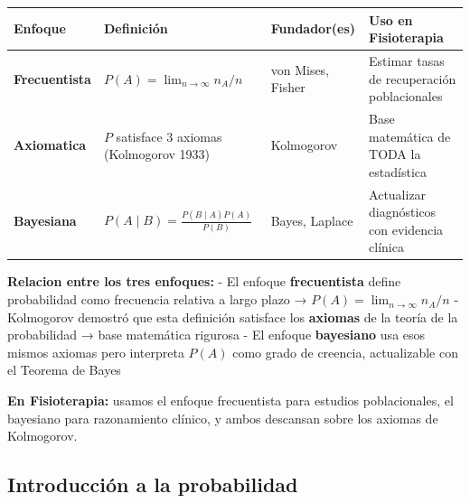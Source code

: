 \documentclass[
  letterpaper,
  DIV=11,
  numbers=noendperiod]{scrartcl}
\newcounter{none} %
\begin{document}
{\def\LTcaptype{none} %
\begin{longtable}[]{@{}
  >{\raggedright\arraybackslash}p{}
  >{\raggedright\arraybackslash}p{}
  >{\raggedright\arraybackslash}p{}
  >{\raggedright\arraybackslash}p{}@{}}
\toprule\noalign{}
\begin{minipage}[b]{\linewidth}\raggedright
Enfoque
\end{minipage} & \begin{minipage}[b]{\linewidth}\raggedright
Definición
\end{minipage} & \begin{minipage}[b]{\linewidth}\raggedright
Fundador(es)
\end{minipage} & \begin{minipage}[b]{\linewidth}\raggedright
Uso en Fisioterapia
\end{minipage} \\
\midrule\noalign{}
\endhead
\bottomrule\noalign{}
\endlastfoot
\textbf{Frecuentista} & \(P(A) = \lim_{n\to\infty} n_A/n\) & von Mises,
Fisher & Estimar tasas de recuperación poblacionales \\
\textbf{Axiomatica} & \(P\) satisface 3 axiomas (Kolmogorov 1933) &
Kolmogorov & Base matemática de TODA la estadística \\
\textbf{Bayesiana} & \(P(A \mid B) = \frac{P(B \mid A)P(A)}{P(B)}\) &
Bayes, Laplace & Actualizar diagnósticos con evidencia clínica \\
\end{longtable}
}

\textbf{Relacion entre los tres enfoques:} - El enfoque
\textbf{frecuentista} define probabilidad como frecuencia relativa a
largo plazo → \(P(A) = \lim_{n\to\infty} n_A/n\) - Kolmogorov demostró
que esta definición satisface los \textbf{axiomas} de la teoría de la
probabilidad → base matemática rigurosa - El enfoque \textbf{bayesiano}
usa esos mismos axiomas pero interpreta \(P(A)\) como grado de creencia,
actualizable con el Teorema de Bayes

\textbf{En Fisioterapia:} usamos el enfoque frecuentista para estudios
poblacionales, el bayesiano para razonamiento clínico, y ambos descansan
sobre los axiomas de Kolmogorov.

\subsection{Introducción a la
probabilidad}\label{introduccion-a-la-probabilidad}
\end{document}
